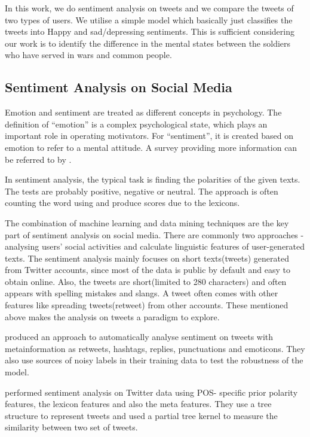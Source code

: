 In this work, we do sentiment analysis on tweets and we compare the tweets of
two types of users. We utilise a simple model which basically just classifies
the tweets into Happy and sad/depressing sentiments. This is sufficient
considering our work is to identify the difference in the mental states between
the soldiers who have served in wars and common people.

\subsection{Sentiment Analysis on Social Media}

Emotion and sentiment are treated as different concepts in psychology. The
definition of \enquote{emotion} is a complex psychological state, which plays an
important role in operating motivators. For \enquote{sentiment}, it is created based on
emotion to refer to a mental attitude. A survey providing more information can
be referred to by \citep{yue2018survey}.

In sentiment analysis, the typical task is finding the polarities of the given
texts. The tests are probably positive, negative or neutral. The approach is
often counting the word using and produce scores due to the lexicons.

The combination of machine learning and data mining techniques are the key part
of sentiment analysis on social media. There are commonly two approaches -
analysing users' social activities and calculate linguistic features of
user-generated texts. The sentiment analysis mainly focuses on short texts(tweets)
generated from Twitter accounts, since most of the data is public by default and
easy to obtain online. Also, the tweets are short(limited to 280 characters) and
often appears with spelling mistakes and slangs. A tweet often comes with other
features like spreading tweets(retweet) from other accounts. These mentioned
above makes the analysis on tweets a paradigm to explore.

\cite{robustTwitter2010Luciano} produced an approach to automatically analyse
sentiment on tweets with metainformation as retweets, hashtags, replies,
punctuations and emoticons. They also use sources of noisy labels in their
training data to test the robustness of the model.

\cite{agarwal2011sentiment} performed sentiment analysis on Twitter data using POS-
specific prior polarity features, the lexicon features and also the meta
features. They use a tree structure to represent tweets and used a partial tree
kernel to measure the similarity between two set of tweets.

